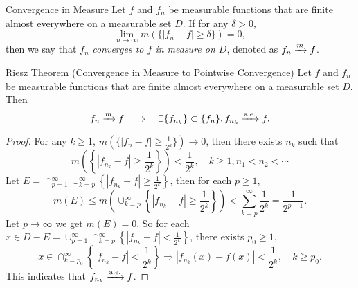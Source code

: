 \begin{definition}{Convergence in Measure}{}
  Let $f$ and $f_n$ be measurable functions that are finite almost everywhere on
  a measurable set $D$. If for any $\delta > 0$,
  \begin{equation}
    \lim \limits _{n \rightarrow \infty} m(\{|f_n - f| \geq \delta\}) = 0,
  \end{equation}
  then we say that $f_n$ \emph{converges to $f$ in measure on $D$},
  denoted as $f_n \xrightarrow{m} f$.
\end{definition}

\begin{theorem}{Riesz Theorem (Convergence in Measure to Pointwise Convergence)}{}
  Let $f$ and $f_n$ be measurable functions that are finite almost everywhere on
  a measurable set $D$. Then
  \begin{equation}
    f_n \xrightarrow{m} f \quad \Rightarrow \quad \exists \{f_{n_k}\} \subset \{f_n\}, f_{n_k} \xrightarrow{\text{a.e.}} f.
  \end{equation}
\end{theorem}

\begin{proof}
  For any $k \geq 1$, $m \left( \{ |f_n - f| \geq \frac{1}{2^k}\} \right)
  \rightarrow 0$, then there exists $n_k$ such that
  \begin{equation}
    m \left( \left\{ |f_{n_k} - f| \geq \frac{1}{2^k} \right\} \right) < \frac{1}{2^k},
    \quad k \geq 1, n_1 < n_2 < \cdots
  \end{equation}
  Let $E = \cap _{p = 1}^{\infty} \cup _{k = p}^{\infty} \left\{ |f_{n_k} - f|
    \geq \frac{1}{2^k} \right\}$,
  then for each $p \geq 1$,
  \begin{equation}
    m(E) \leq m \left( \cup _{k = p}^{\infty} \left\{ |f_{n_k} - f| \geq \frac{1}{2^k} \right\} \right)
    < \sum\limits_{k = p}^{\infty} \frac{1}{2^k} = \frac{1}{2^{p-1}}.
  \end{equation}
  Let $p \rightarrow \infty$ we get $m(E) = 0$.
  So for each $x \in D - E = \cup _{p = 1}^{\infty} \cap _{k = p}^{\infty}
  \left\{ |f_{n_k} - f| < \frac{1}{2^k} \right\}$,
  there exists $p_0 \geq 1$, 
  \begin{equation}
    x \in \cap _{k = p_0}^{\infty} \left\{ |f_{n_k} - f| < \frac{1}{2^k} \right\}
    \Rightarrow
    |f_{n_k}(x) - f(x)| < \frac{1}{2^k}, \quad k \geq p_0.
  \end{equation}
  This indicates that $f_{n_k} \xrightarrow{\text{a.e.}} f$.
\end{proof}

